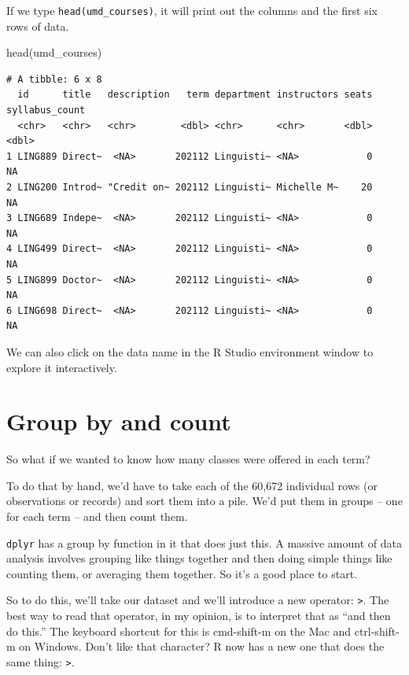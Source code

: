 \documentclass[
  letterpaper,
  DIV=11,
  numbers=noendperiod]{scrreprt}
\newenvironment{Shaded}{\begin{snugshade}}{\end{snugshade}}
\newcommand{\FunctionTok}[1]{\textcolor[rgb]{0.28,0.35,0.67}{#1}}
\newcommand{\NormalTok}[1]{\textcolor[rgb]{0.00,0.23,0.31}{#1}}
\begin{document}
If we type \texttt{head(umd\_courses)}, it will print out the columns
and the first six rows of data.

\begin{Shaded}
\begin{Highlighting}[]
\FunctionTok{head}\NormalTok{(umd\_courses)}
\end{Highlighting}
\end{Shaded}

\begin{verbatim}
# A tibble: 6 x 8
  id      title   description   term department instructors seats syllabus_count
  <chr>   <chr>   <chr>        <dbl> <chr>      <chr>       <dbl>          <dbl>
1 LING889 Direct~  <NA>       202112 Linguisti~ <NA>            0             NA
2 LING200 Introd~ "Credit on~ 202112 Linguisti~ Michelle M~    20             NA
3 LING689 Indepe~  <NA>       202112 Linguisti~ <NA>            0             NA
4 LING499 Direct~  <NA>       202112 Linguisti~ <NA>            0             NA
5 LING899 Doctor~  <NA>       202112 Linguisti~ <NA>            0             NA
6 LING698 Direct~  <NA>       202112 Linguisti~ <NA>            0             NA
\end{verbatim}

We can also click on the data name in the R Studio environment window to
explore it interactively.

\hypertarget{group-by-and-count}{%
\section{Group by and count}\label{group-by-and-count}}

So what if we wanted to know how many classes were offered in each term?

To do that by hand, we'd have to take each of the 60,672 individual rows
(or observations or records) and sort them into a pile. We'd put them in
groups -- one for each term -- and then count them.

\texttt{dplyr} has a group by function in it that does just this. A
massive amount of data analysis involves grouping like things together
and then doing simple things like counting them, or averaging them
together. So it's a good place to start.

So to do this, we'll take our dataset and we'll introduce a new
operator: \texttt{\textbar{}\textgreater{}}. The best way to read that
operator, in my opinion, is to interpret that as ``and then do this.''
The keyboard shortcut for this is cmd-shift-m on the Mac and
ctrl-shift-m on Windows. Don't like that character? R now has a new one
that does the same thing: \texttt{\textbar{}\textgreater{}}.
\end{document}
